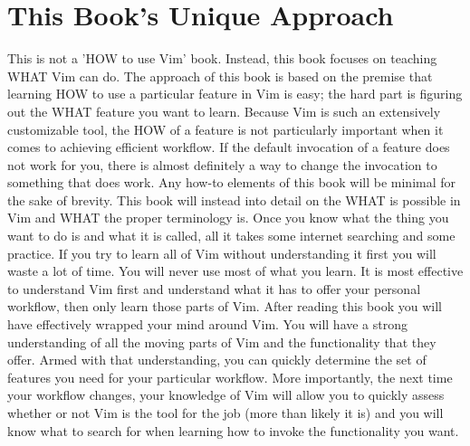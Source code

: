 \documentclass[12pt, oneside]{book}
\begin{document}
\section{This Book's Unique Approach}
This is not a 'HOW to use Vim' book.  Instead, this book focuses on teaching WHAT Vim can do.  The approach of this book is based on the premise that learning HOW to use a particular feature in Vim is easy; the hard part is figuring out the WHAT feature you want to learn.  Because Vim is such an extensively customizable tool, the HOW of a feature is not particularly important when it comes to achieving efficient workflow.  If the default invocation of a feature does not work for you, there is almost definitely a way to change the invocation to something that does work.  Any how-to elements of this book will be minimal for the sake of brevity.  This book will instead into detail on the WHAT is possible in Vim and WHAT the proper terminology is.  Once you know what the thing you want to do is and what it is called, all it takes some internet searching and some practice.  If you try to learn all of Vim without understanding it first you will waste a lot of time.  You will never use most of what you learn.  It is most effective to understand Vim first and understand what it has to offer your personal workflow, then only learn those parts of Vim.  After reading this book you will have effectively wrapped your mind around Vim.  You will have a strong understanding of all the moving parts of Vim and the functionality that they offer.  Armed with that understanding, you can quickly determine the set of features you need for your particular workflow.  More importantly, the next time your workflow changes, your knowledge of Vim will allow you to quickly assess whether or not Vim is the tool for the job (more than likely it is) and you will know what to search for when learning how to invoke the functionality you want.
\end{document}

